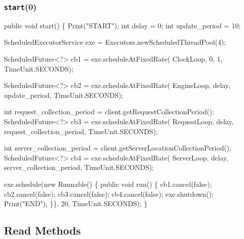 \documentclass{article}
\def\nwendcode{\endtrivlist \endgroup}
\let\nwdocspar=\par
\begin{document}
\subsubsection{{\tt{}\protect{}start}(0)}
\nwenddocs{}\endmoddef{}
public void start() \{
  Print("START");
  int delay = 0;
  int update_period = 10;

  ScheduledExecutorService exe = Executors.newScheduledThreadPool(4);

  ScheduledFuture<?> cb1 = exe.scheduleAtFixedRate(
    ClockLoop, 0, 1, TimeUnit.SECONDS);

  ScheduledFuture<?> cb2 = exe.scheduleAtFixedRate(
    EngineLoop, delay, update_period, TimeUnit.SECONDS);

  int request_collection_period = client.getRequestCollectionPeriod();
  ScheduledFuture<?> cb3 = exe.scheduleAtFixedRate(
    RequestLoop, delay, request_collection_period, TimeUnit.SECONDS);

  int server_collection_period = client.getServerLocationCollectionPeriod();
  ScheduledFuture<?> cb4 = exe.scheduleAtFixedRate(
    ServerLoop, delay, server_collection_period, TimeUnit.SECONDS);

  exe.schedule(new Runnable() \{
    public void run() \{
      cb1.cancel(false);
      cb2.cancel(false);
      cb3.cancel(false);
      cb4.cancel(false);
      exe.shutdown();
      Print("END");
    \}\}, 20, TimeUnit.SECONDS);
\}
\eatline
{}\nwendcode{}\nwdocspar
\subsection{Read Methods}
\end{document}
